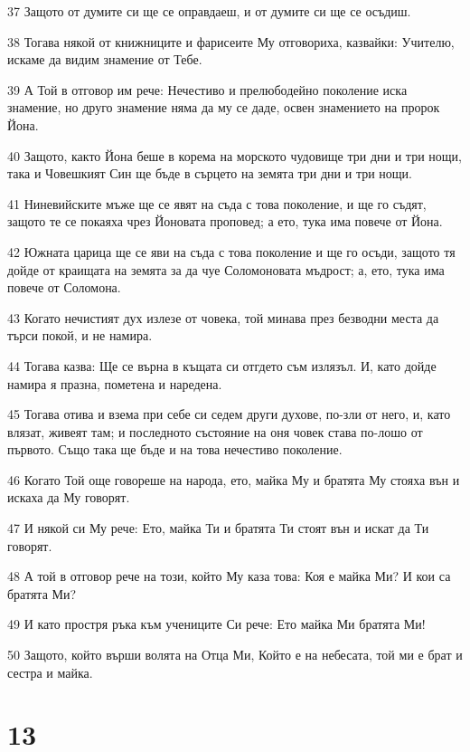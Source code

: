 \par 37 Защото от думите си ще се оправдаеш, и от думите си ще се осъдиш.
\par 38 Тогава някой от книжниците и фарисеите Му отговориха, казвайки: Учителю, искаме да видим знамение от Тебе.
\par 39 А Той в отговор им рече: Нечестиво и прелюбодейно поколение иска знамение, но друго знамение няма да му се даде, освен знамението на пророк Йона.
\par 40 Защото, както Йона беше в корема на морското чудовище три дни и три нощи, така и Човешкият Син ще бъде в сърцето на земята три дни и три нощи.
\par 41 Ниневийските мъже ще се явят на съда с това поколение, и ще го съдят, защото те се покаяха чрез Йоновата проповед; а ето, тука има повече от Йона.
\par 42 Южната царица ще се яви на съда с това поколение и ще го осъди, защото тя дойде от краищата на земята за да чуе Соломоновата мъдрост; а, ето, тука има повече от Соломона.
\par 43 Когато нечистият дух излезе от човека, той минава през безводни места да търси покой, и не намира.
\par 44 Тогава казва: Ще се върна в къщата си отгдето съм излязъл. И, като дойде намира я празна, пометена и наредена.
\par 45 Тогава отива и взема при себе си седем други духове, по-зли от него, и, като влязат, живеят там; и последното състояние на оня човек става по-лошо от първото. Също така ще бъде и на това нечестиво поколение.
\par 46 Когато Той още говореше на народа, ето, майка Му и братята Му стояха вън и искаха да Му говорят.
\par 47 И някой си Му рече: Ето, майка Ти и братята Ти стоят вън и искат да Ти говорят.
\par 48 А той в отговор рече на този, който Му каза това: Коя е майка Ми? И кои са братята Ми?
\par 49 И като простря ръка към учениците Си рече: Ето майка Ми братята Ми!
\par 50 Защото, който върши волята на Отца Ми, Който е на небесата, той ми е брат и сестра и майка.

\chapter{13}

